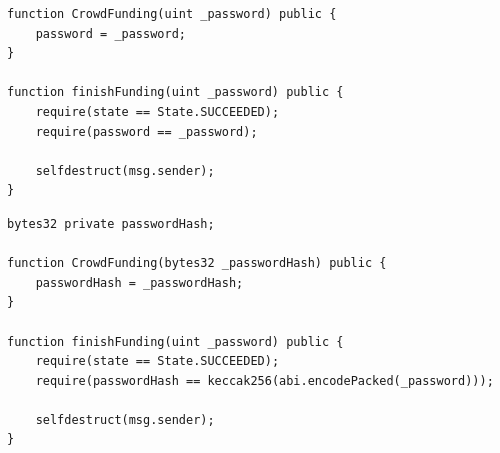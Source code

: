 \documentclass[xcolor=x11names,compress]{beamer}
\begin{document}
\begin{frame}[fragile]
\begin{overprint}
\begin{minipage}[c][0.7\textheight][c]{\textwidth}
\begin{verbatim}
function CrowdFunding(uint _password) public {
    password = _password;
}

function finishFunding(uint _password) public {
    require(state == State.SUCCEEDED);
    require(password == _password);
    
    selfdestruct(msg.sender);
}
    \end{verbatim}
		\end{minipage}
		\begin{minipage}[c][0.7\textheight][c]{\textwidth}
			\begin{verbatim}
bytes32 private passwordHash;

function CrowdFunding(bytes32 _passwordHash) public {
    passwordHash = _passwordHash;
}

function finishFunding(uint _password) public {
    require(state == State.SUCCEEDED);
    require(passwordHash == keccak256(abi.encodePacked(_password)));
    
    selfdestruct(msg.sender);
}
    \end{verbatim}
		\end{minipage}
	\end{overprint}
\end{frame}
\end{document}
